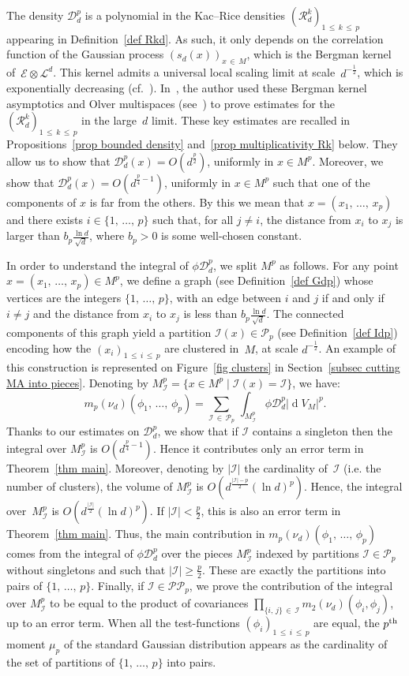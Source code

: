 \documentclass[AHL,Unicode,longabstracts,published]{cedram}
\DeclareMathOperator{\dmesure}{d}
\newcommand{\D}{\mathcal{D}}
\newcommand{\E}{\mathcal{E}}
\newcommand{\I}{\mathcal{I}}
\renewcommand{\L}{\mathcal{L}}
\newcommand{\clR}{\mathcal{R}}
\newcommand{\pa}{\mathcal{P}\!}
\newcommand{\pp}{\mathcal{P\!P}\!}
\newcommand{\norm}[1]{\left\lvert #1 \right\rvert}
\newcommand{\rmes}[1]{\norm{\dmesure\! V_{#1}}}
\renewcommand{\geq}{\geqslant}
\renewcommand{\leq}{\leqslant}
\begin{document}
The density $\D_d^p$ is a polynomial in the Kac--Rice densities $(\clR^k_d)_{1 \,\leq\,k\,\leq\,p}$ appearing in Definition~\ref{def Rkd}. As such, it only depends on the correlation function of the Gaussian process $(s_d(x))_{x\,\in\, M}$, which is the Bergman kernel of~$\E \otimes \L^d$. This kernel admits a universal local scaling limit at scale~$d^{-\frac{1}{2}}$, which is exponentially decreasing (cf.~\cite{MM2007,MM2015}). In~\cite{Anc2019}, the author used these Bergman kernel asymptotics and Olver multispaces (see~\cite{Olv2001}) to prove estimates for the $(\clR^k_d)_{1\,\leq\,k\,\leq\,p}$ in the large~$d$ limit. These key estimates are recalled in Propositions~\ref{prop bounded density} and~\ref{prop multiplicativity Rk} below. They allow us to show that $\D_d^p(x) = O(d^\frac{p}{2})$, uniformly in $x \in M^p$. Moreover, we show that $\D_d^p(x) = O(d^{\frac{p}{4}-1})$, uniformly in $x \in M^p$ such that one of the components of $x$ is far from the others. By this we mean that $x =(x_1,\,\dots,\,x_p)$ and there exists $i \in \{1,\,\dots,\,p\}$ such that, for all $j \neq i$, the distance from $x_i$ to $x_j$ is larger than $b_p\frac{\ln d}{\sqrt{d}}$, where $b_p >0$ is some well-chosen constant.

In order to understand the integral of $\phi\D^p_d$, we split $M^p$ as follows. For any point $x=(x_1,\,\dots,\,x_p) \in M^p$, we define a graph (see Definition~\ref{def Gdp}) whose vertices are the integers $\{1,\,\dots,\,p\}$, with an edge between $i$ and $j$ if and only if $i \neq j$ and the distance from $x_i$ to $x_j$ is less than $b_p \tfrac{\ln d}{\sqrt{d}}$. The connected components of this graph yield a partition $\I(x) \in \pa_p$ (see Definition~\ref{def Idp}) encoding how the $(x_i)_{1\,\leq\,i\,\leq\, p}$ are clustered in~$M$, at scale $d^{-\frac{1}{2}}$. An example of this construction is represented on Figure~\ref{fig clusters} in Section~\ref{subsec cutting MA into pieces}. Denoting by $M^p_\I = \{ x \in M^p \mid \I(x)=\I\}$, we have:
\[
m_p(\nu_d)(\phi_1,\,\dots,\,\phi_p) = \sum_{\I\,\in\,\pa_p}\,\int_{M^p_\I} \phi \D_d^p \rmes{M}^p.
\]
Thanks to our estimates on $\D^p_d$, we show that if $\I$ contains a singleton then the integral over $M^p_\I$ is $O(d^{\frac{p}{4}-1})$. Hence it contributes only an error term in Theorem~\ref{thm main}. Moreover, denoting by $|\I|$ the cardinality of~$\I$ (i.e. the number of clusters), the volume of $M^p_\I$ is $O(d^\frac{|\I|-p}{2}(\ln d)^{p})$. Hence, the integral over~$M^p_\I$ is $O(d^\frac{|\I|}{2}(\ln d)^p)$. If $|\I| < \frac{p}{2}$, this is also an error term in Theorem~\ref{thm main}. Thus, the main contribution in $m_p(\nu_d)(\phi_1,\,\dots,\,\phi_p)$ comes from the integral of $\phi \D^p_d$ over the pieces $M^p_\I$ indexed by partitions $\I \in \pa_p$ without singletons and such that $|\I| \geq \frac{p}{2}$. These are exactly the partitions into pairs of $\{1,\,\dots,\,p\}$. Finally, if $\I\in \pp_p$, we prove the contribution of the integral over $M^p_\I$ to be equal to the product of covariances $\prod_{\{i,\,j\}\,\in\,\I} m_2(\nu_d)(\phi_i,\phi_j)$, up to an error term. When all the test-functions $(\phi_i)_{1\,\leq\,i\,\leq\,p}$ are equal, the $p^{\rm th}$ moment $\mu_p$ of the standard Gaussian distribution appears as the cardinality of the set of partitions of $\{1,\,\dots,\,p\}$ into pairs.
\end{document}
